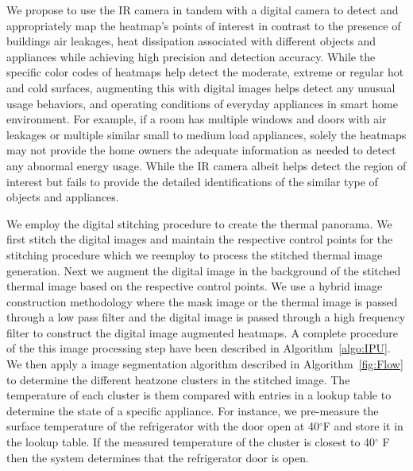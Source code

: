 We propose to use the IR camera in tandem with a digital camera to detect and appropriately map the heatmap's points of interest in contrast to the presence of buildings air leakages, heat dissipation associated with different objects and appliances while achieving high precision and detection accuracy. While the specific color codes of heatmaps help detect the moderate, extreme or regular hot and cold surfaces, augmenting this with digital images helps detect any unusual usage behaviors, and operating conditions of everyday appliances in smart home environment. For example, if a room has multiple windows and doors with air leakages or multiple similar small to medium load appliances, solely the heatmaps may not provide the home owners the adequate information as needed to detect any abnormal energy usage. While the IR camera albeit helps detect the region of interest but fails to provide the detailed identifications of the similar type of objects and appliances.


We employ the digital stitching procedure to create the thermal panorama. We first stitch the digital images and maintain the respective control points for the stitching procedure which we reemploy to process the stitched thermal image generation. Next we augment the digital image in the background of the stitched thermal image based on the respective control points.%
 We use a hybrid image construction methodology where the mask image or the thermal image is passed through a low pass filter and the digital image is passed through a high frequency filter to construct the digital image augmented heatmaps. A complete procedure of the this image processing step have been described in Algorithm~\ref{algo:IPU}. We then apply a image segmentation algorithm described in Algorithm~\ref{fig:Flow} to determine the different heatzone clusters in the stitched image. The temperature of each cluster is them compared with entries in a lookup table to determine the state of a specific appliance. For instance, we pre-measure the surface temperature of the refrigerator with the door open at 40$^{\circ}$F  and store it in the lookup table. If the measured temperature of the cluster is closest to 40$^{\circ}$ F then the system determines that the refrigerator door is open.

